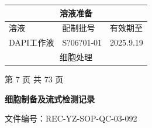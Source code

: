\documentclass[UTF8,10pt,a4paper,fontset=fandol]{ctexart}
\newcommand{\fieldvalue}[1]{#1}
\newcommand{\handwritten}[1]{#1}
\begin{document}
\begin{center}
\begin{tabularx}{\textwidth}{|p{}|X|p{}|}
\hline
\multicolumn{3}{|c|}{溶液准备} \\ \hline
溶液 & 配制批号 & 有效期至 \\ \hline
DAPI工作液 &
\fieldvalue{\handwritten{S?06?01-01}} &
\fieldvalue{\handwritten{2025.9.19}} \\ \hline
\multicolumn{3}{|c|}{细胞处理} \\ \hline
\end{tabularx}
\end{center}

\begin{center}
第 7 页 共 73 页
\end{center}

\newpage

\begin{center}
\textbf{细胞制备及流式检测记录}
\end{center}

文件编号：REC-YZ-SOP-QC-03-092
\end{document}
